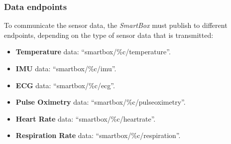 \subsubsection{Data endpoints}
To communicate the sensor data, the \textit{SmartBox} must publish to different endpoints, depending on the type of sensor data that is transmitted:

\begin{itemize}
    \item \textbf{Temperature} data: ``smartbox/\%c/temperature''.
    \item \textbf{\acf{IMU}} data: ``smartbox/\%c/imu''.
    \item \textbf{\acf{ECG}} data: ``smartbox/\%c/ecg''.
    \item \textbf{Pulse Oximetry} data: ``smartbox/\%c/pulseoximetry''.
    \item \textbf{Heart Rate} data: ``smartbox/\%c/heartrate''.
    \item \textbf{Respiration Rate} data: ``smartbox/\%c/respiration''.
\end{itemize}

